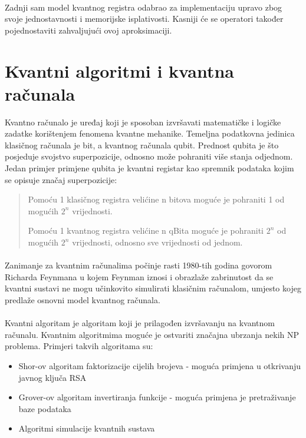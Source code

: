 \documentclass[times, utf8, zavrsni, numeric]{fer}
\begin{document}
\paragraph{}
Zadnji sam model kvantnog registra odabrao za implementaciju upravo zbog svoje jednostavnosti i memorijske isplativosti. Kasniji će se operatori također pojednostaviti zahvaljujući ovoj aproksimaciji.

\section{Kvantni algoritmi i kvantna računala}
Kvantno računalo je uređaj koji je sposoban izvršavati matematičke i logičke zadatke korištenjem fenomena kvantne mehanike. Temeljna podatkovna jedinica klasičnog računala je bit, a kvantnog računala qubit. Prednost qubita je što posjeduje svojstvo superpozicije, odnosno može pohraniti više stanja odjednom. Jedan primjer primjene qubita je kvantni registar kao spremnik podataka kojim se opisuje značaj superpozicije:
\begin{quote}
Pomoću 1 klasičnog registra velićine n bitova moguće je pohraniti 1 od mogućih $2^n$ vrijednosti.

Pomoću 1 kvantnog registra velićine n qBita moguće je pohraniti $2^n$ od mogućih $2^n$ vrijednosti, odnosno sve vrijednosti od jednom.
\end{quote}

\paragraph{}
Zanimanje za kvantnim računalima počinje rasti 1980-tih godina govorom Richarda Feynmana u kojem Feynman iznosi i obrazlaže zabrinutost da se kvantni sustavi ne mogu učinkovito simulirati klasičnim računalom, umjesto kojeg predlaže osnovni model kvantnog računala. \citep{q_history}

\paragraph{}
Kvantni algoritam je algoritam koji je prilagođen izvršavanju na kvantnom računalu. Kvantnim algoritmima moguće je ostvariti značajna ubrzanja nekih NP problema. \cite{qga_apply} \citep{han_phd} Primjeri takvih algoritama su:
\begin{itemize}
\item Shor-ov algoritam faktorizacije cijelih brojeva - moguća primjena u otkrivanju javnog ključa RSA
\item Grover-ov algoritam invertiranja funkcije - moguća primjena je pretraživanje baze podataka
\item Algoritmi simulacije kvantnih sustava
\end{itemize}
\end{document}
